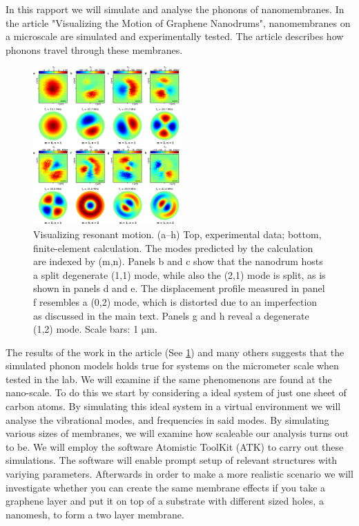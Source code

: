 In this rapport we will simulate and analyse the phonons of nanomembranes. In the article "Visualizing the Motion of Graphene Nanodrums"\cite{Davidovikj2016}, nanomembranes on a microscale are simulated and experimentally tested. The article describes how phonons travel through these membranes. 
\begin{figure}
    \centering
    \includegraphics[width=0.5\textwidth]{Figures/motivation.eps}
    \caption{Visualizing resonant motion. (a–h) Top, experimental data; bottom, finite-element calculation. The modes predicted by the calculation are indexed by (m,n). Panels b and c show that the nanodrum hosts a split degenerate (1,1) mode, while also the (2,1) mode is split, as is shown in panels d and e. The displacement profile measured in panel f resembles a (0,2) mode, which is distorted due to an imperfection as discussed in the main text. Panels g and h reveal a degenerate (1,2) mode. Scale bars: 1 $\mathrm{\mu m}$.\cite{Davidovikj2016}}
    \label{Motivation}
\end{figure}
The results of the work in the article\cite{Davidovikj2016} (See \cref{Motivation}) and many others suggests that the simulated phonon models holds true for systems on the micrometer scale when tested in the lab. We will examine if the same phenomenons are found at the nano-scale. To do this we start by considering a ideal system of just one sheet of carbon atoms. By simulating this ideal system in a virtual environment we will analyse the vibrational modes, and frequencies in said modes. By simulating various sizes of membranes, we will examine how scaleable our analysis turns out to be.
We will employ the software Atomistic ToolKit (ATK)\cite{QuantumWise} to carry out these simulations. The
software will enable prompt setup of relevant structures with variying parameters.
Afterwards in order to make a more realistic scenario we will investigate whether you can create the same membrane effects if you take a graphene layer and put it on top of a substrate with different sized holes, a nanomesh, to form a two layer membrane.
